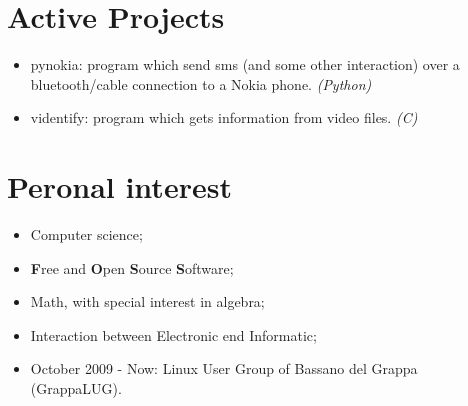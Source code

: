 \documentclass[pdftex, a4paper, 11pt]{article}
\begin{document}
\section*{Active Projects}
\begin{itemize}
\item pynokia: program which send sms (and some other interaction)
  over a bluetooth/cable connection to a Nokia phone. {\em (Python)}\\
\item videntify: program which gets information from video files. {\em (C)}\\
\end{itemize}


\section*{Peronal interest}
\begin{itemize}
\item Computer science;
\item {\bf F}ree and {\bf O}pen {\bf S}ource {\bf S}oftware;
\item Math, with special interest in algebra;
\item Interaction between Electronic end Informatic;
\item October 2009 - Now: Linux User Group of Bassano del Grappa (GrappaLUG).
\end{itemize}
\end{document}
